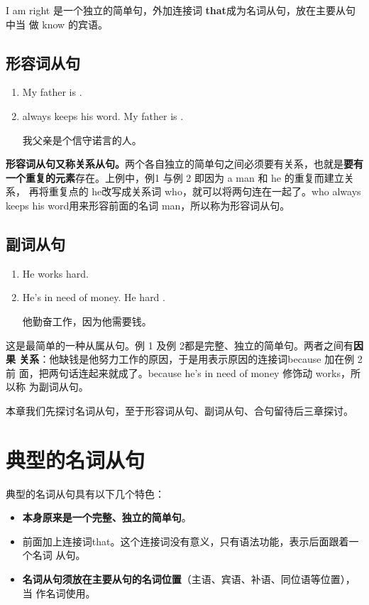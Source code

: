 I am right 是一个独立的简单句，外加连接词 \textbf{that}成为名词从句，放在主要从句中当
做 know 的宾语。

\subsection{形容词从句}

\begin{enumerate}
\item My father is .
\item {} always keeps his word.
\reitem My father is  .

我父亲是个信守诺言的人。
\end{enumerate}

\textbf{形容词从句又称关系从句。}两个各自独立的简单句之间必须要有关系，也就是\textbf{要有
  一个重复的元素}存在。上例中，例1 与例 2 即因为 a man 和 he 的重复而建立关系，
再将重复点的 he改写成关系词 who，就可以将两句连在一起了。who always keeps
his word用来形容前面的名词 man，所以称为形容词从句。

\subsection{副词从句}

\begin{enumerate}
\item   He works hard.
\item He's in need of money. \reitem He  hard .

他勤奋工作，因为他需要钱。
\end{enumerate}
这是最简单的一种从属从句。例 1 及例 2都是完整、独立的简单句。两者之间有\textbf{因果
  关系}：他缺钱是他努力工作的原因，于是用表示原因的连接词because 加在例 2 前
面，把两句话连起来就成了。because he's in need of money 修饰动 works，所以称
为副词从句。

本章我们先探讨名词从句，至于形容词从句、副词从句、合句留待后三章探讨。

\section{典型的名词从句}

典型的名词从句具有以下几个特色：
\begin{itemize}
\item \textbf{本身原来是一个完整、独立的简单句}。

\item 前面加上连接词that。这个连接词没有意义，只有语法功能，表示后面跟着一个名词
  从句。

\item \textbf{名词从句须放在主要从句的名词位置}（主语、宾语、补语、同位语等位置），当
  作名词使用。
\end{itemize}

